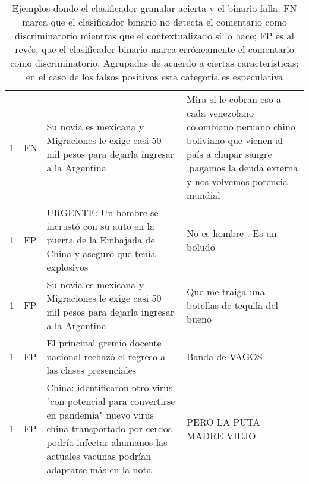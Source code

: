 \begin{table}[ht!]
\begin{tabular}{p{} p{} p{} p{}}
        1 & FN & Su novia es mexicana y Migraciones le exige casi 50 mil pesos para dejarla ingresar a la Argentina &  Mira si le cobran eso a cada venezolano colombiano peruano chino boliviano que vienen al país a chupar sangre ,pagamos la deuda externa y nos volvemos potencia mundial \\
        1 & FP & URGENTE: Un hombre se incrustó con su auto en la puerta de la Embajada de China y aseguró que tenía explosivos & No es hombre . Es un boludo \\
        1 & FP & Su novia es mexicana y Migraciones le exige casi 50 mil pesos para dejarla ingresar a la Argentina &  Que me traiga una botellas de tequila del bueno \\
        1 & FP & El principal gremio docente nacional rechazó el regreso a las clases presenciales &Banda de VAGOS \\
        1 & FP & China: identificaron otro virus "con potencial para convertirse en pandemia" nuevo virus china transportado por cerdos podría infectar ahumanos las actuales vacunas podrían adaptarse más en la nota & PERO LA PUTA MADRE VIEJO \\
    \end{tabular}
    \caption{Ejemplos donde el clasificador granular acierta y el binario falla. FN marca que el clasificador binario no detecta el comentario como discriminatorio mientras que el contextualizado sí lo hace; FP es al revés, que el clasificador binario marca erróneamente el comentario como discriminatorio. Agrupadas de acuerdo a ciertas características; en el caso de los falsos positivos esta categoría es especulativa}
    \label{tab:fine_vs_plain_comparison}
\end{table}